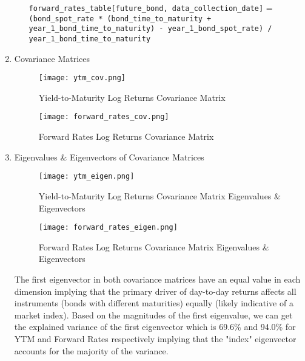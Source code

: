 \documentclass{article}
\begin{document}
\begin{enumerate}
\begin{enumerate}
\begin{algorithm}[H]
\begin{algorithmic}[1]
                            \State \texttt{forward\_rates\_table[future\_bond, data\_collection\_date]} =
                            \Statex \hspace{1cm} \texttt{(bond\_spot\_rate * (bond\_time\_to\_maturity + year\_1\_bond\_time\_to\_maturity) - year\_1\_bond\_spot\_rate) / year\_1\_bond\_time\_to\_maturity}
                            \EndFor
                            \EndFor
                        \end{algorithmic}
                    \end{algorithm}
          \end{enumerate}


    \item Covariance Matrices
          \begin{figure}[H]
              \centering
              \begin{minipage}{0.45\textwidth}
                  \centering
                  \texttt{[image: ytm\_cov.png]}
                  \caption{Yield-to-Maturity Log Returns Covariance Matrix}
              \end{minipage}
              \hfill
              \begin{minipage}{0.45\textwidth}
                  \centering
                  \texttt{[image: forward\_rates\_cov.png]}
                  \caption{Forward Rates Log Returns Covariance Matrix}
              \end{minipage}
          \end{figure}
    \item Eigenvalues \& Eigenvectors of Covariance Matrices
          \begin{figure}[H]
              \centering
              \begin{minipage}{0.45\textwidth}
                  \centering
                  \texttt{[image: ytm\_eigen.png]}
                  \caption{Yield-to-Maturity Log Returns Covariance Matrix Eigenvalues \& Eigenvectors}
              \end{minipage}
              \hfill
              \begin{minipage}{0.45\textwidth}
                  \centering
                  \texttt{[image: forward\_rates\_eigen.png]}
                  \caption{Forward Rates Log Returns Covariance Matrix Eigenvalues \& Eigenvectors}
              \end{minipage}
          \end{figure}

          The first eigenvector in both covariance matrices have an equal value in each dimension implying that the primary driver of day-to-day returns affects all instruments (bonds with different maturities) equally (likely indicative of a market index). Based on the magnitudes of the first eigenvalue, we can get the explained variance of the first eigenvector which is 69.6\% and 94.0\% for YTM and Forward Rates respectively implying that the "index" eigenvector accounts for the majority of the variance.
\end{enumerate}
\end{document}
